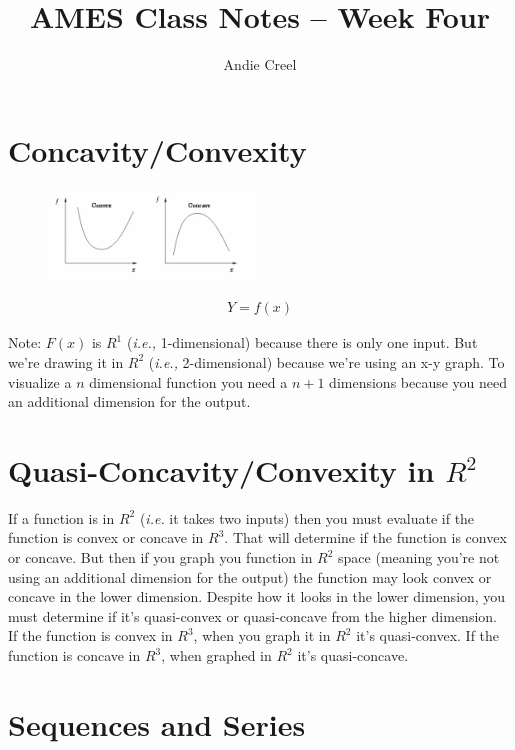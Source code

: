 \documentclass{article}
\title{AMES Class Notes -- Week Four}
\author{Andie Creel}
\begin{document}
\maketitle

\section{Concavity/Convexity}
\begin{figure}[htp]
    \centering
        \includegraphics[width=0.5\textwidth]{Screen Shot 2023-09-18 at 10.38.18 AM.png}
\end{figure}

\begin{align*}
    Y = f(x) 
\end{align*}

Note: $F(x)$ is $R^1$ (\textit{i.e.,} 1-dimensional) because there is only one input. But we're drawing it in $R^2$ (\textit{i.e.,} 2-dimensional) because we're using an x-y graph. To visualize a $n$ dimensional function you need a $n+1$ dimensions because you need an additional dimension for the output.

\section{Quasi-Concavity/Convexity in $R^2$}

If a function is in $R^2$ (\textit{i.e.} it takes two inputs) then you must evaluate if  the function is convex or concave in $R^3$. That will determine if the function is convex or concave. But then if you graph you function in $R^2$ space (meaning you're not using an additional dimension for the output) the function may look convex or concave in the lower dimension. Despite how it looks in the lower dimension, you must determine if it's quasi-convex or quasi-concave from the higher dimension.  \\

If the function is convex in $R^3$, when you graph it in $R^2$ it's quasi-convex. If the function is concave in $R^3$, when graphed in $R^2$ it's quasi-concave. 

\section{Sequences and Series}
\end{document}
